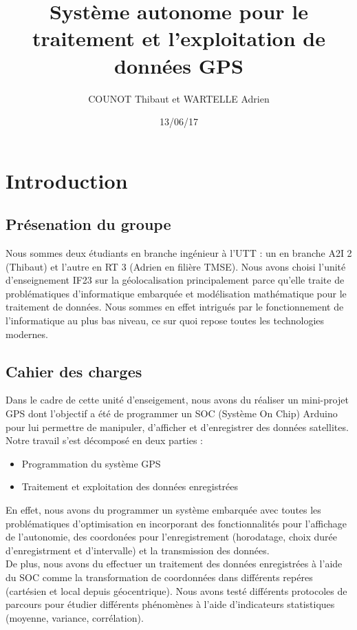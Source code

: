 \documentclass{report}
\title{Système autonome pour le traitement et l'exploitation de données GPS}
\author{COUNOT Thibaut et WARTELLE Adrien}
\date{13/06/17}
\begin{document}
\maketitle
\tableofcontents

\chapter{Introduction}
\section{Présenation du groupe}
Nous sommes deux étudiants en branche ingénieur à l'UTT :
un en branche A2I 2 (Thibaut) et l'autre en RT 3 (Adrien en filière TMSE). 
Nous avons choisi l'unité d'enseignement IF23 sur la géolocalisation 
principalement parce qu'elle traite 
de problématiques d'informatique embarquée et modélisation mathématique
pour le traitement de données. Nous sommes en effet intrigués par le
fonctionnement de l'informatique au plus bas niveau, ce sur quoi repose
toutes les technologies modernes.

\section{Cahier des charges}

Dans le cadre de cette unité d'enseigement, nous avons du réaliser
un mini-projet GPS dont l'objectif a été de programmer un SOC (Système
 On Chip) Arduino pour lui permettre de manipuler, d'afficher et 
 d'enregistrer des données satellites. Notre travail s'est décomposé
 en deux parties :
 \begin{itemize}
 \item Programmation du système GPS
 \item Traitement et exploitation des données enregistrées
 \end{itemize}
 En effet, nous avons du programmer un système embarquée
 avec toutes les problématiques d'optimisation en incorporant des
 fonctionnalités pour l'affichage de l'autonomie, des coordonées
 pour l'enregistrement (horodatage, choix durée d'enregistrment
 et d'intervalle) et la transmission des données. \\
 De plus, nous avons du effectuer un traitement des données enregistrées
 à l'aide du SOC comme la transformation de coordonnées dans différents
 repéres (cartésien et local depuis géocentrique). Nous avons testé
 différents protocoles de parcours pour étudier différents phénomènes
 à l'aide d'indicateurs statistiques (moyenne, variance, corrélation). 
\end{document}
